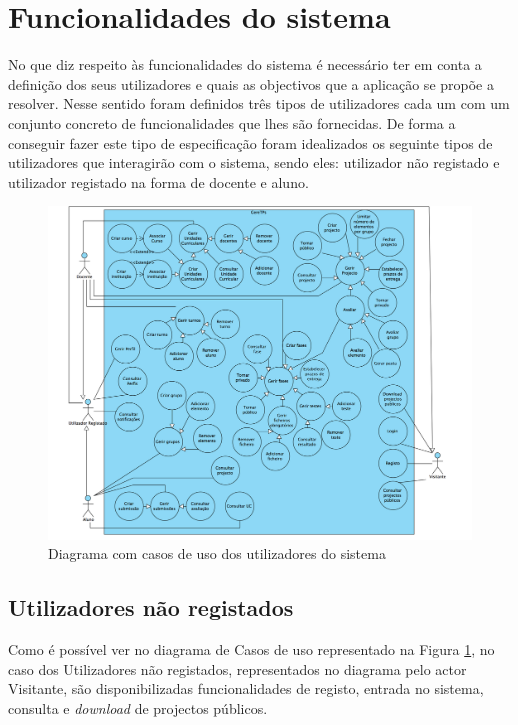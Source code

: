\section{Funcionalidades do sistema}

No que diz respeito às funcionalidades do sistema é necessário ter em conta a definição dos seus 
utilizadores e quais as objectivos que a aplicação se propõe a resolver.
Nesse sentido foram definidos três tipos de utilizadores cada um com um conjunto concreto de 
funcionalidades que lhes são fornecidas.
De forma a conseguir fazer este tipo de especificação foram idealizados os seguinte tipos de utilizadores
que interagirão com o sistema, sendo eles: utilizador não registado e utilizador registado na forma de 
docente e aluno.

\begin{figure}[htbp!] 
   \centering
   \includegraphics[width=1\textwidth]{images/funcionalidades/usecases.png}
    \caption{Diagrama com casos de uso dos utilizadores do sistema}
    \label{fig: usecases}
 \end{figure}

\subsection{Utilizadores não registados}

Como é possível ver no diagrama de Casos de uso representado na Figura \ref{fig: usecases}, no caso 
dos Utilizadores não registados, representados no diagrama pelo actor Visitante, são disponibilizadas
funcionalidades de registo, entrada no sistema, consulta e \textit{download} de projectos públicos.

